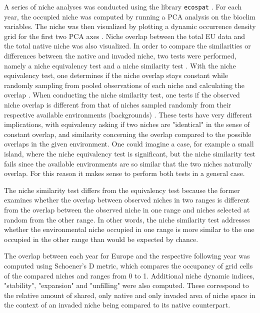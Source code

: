 \documentclass[12pt,a4paper]{article}
\begin{document}
A series of niche analyses was conducted using the library \texttt{ecospat} \autocite{dicola2017ecospat}.
For each year, the occupied niche was computed by running a PCA analysis on the bioclim variables.
The niche was then visualized by plotting a dynamic occurrence density grid for the first two PCA axes \autocite{broennimann2012niche}.
Niche overlap between the total EU data and the total native niche was also visualized.
In order to compare the similarities or differences between the native and invaded niche, two tests were performed, namely a niche equivalency test and a niche similarity test \autocite{broennimann2012niche}.
With the niche equivalency test, one determines if the niche overlap stays constant while randomly sampling from pooled observations of each niche and calculating the overlap \autocite{broennimann2012niche}.
When conducting the niche similarity test, one tests if the observed niche overlap is different from that of niches sampled randomly from their respective available environments (backgrounds) \autocite{broennimann2012niche}.
These tests have very different implications, with equivalency asking if two niches are "identical" in the sense of constant overlap, and similarity concerning the overlap compared to the possible overlaps in the given environment.
One could imagine a case, for example a small island, where the niche equivalency test is significant, but the niche similarity test fails since the available environments are so similar that the two niches naturally overlap.
For this reason it makes sense to perform both tests in a general case.


The niche similarity test differs from the equivalency test
because the former examines whether the overlap between
observed niches in two ranges is different from the overlap
between the observed niche in one range and niches selected at
random from the other range. In other words, the niche similarity test addresses whether the environmental niche occupied
in one range is more similar to the one occupied in the other
range than would be expected by chance.

The overlap between each year for Europe and the respective following year was computed using Schoener's D metric, which compares the occupancy of grid cells of the compared niches and ranges from 0 to 1.
Additional niche dynamic indices, "stability", "expansion" and "unfilling" \autocite{guisan2014nichedyn} were also computed.
These correspond to the relative amount of shared, only native and only invaded area of niche space in the context of an invaded niche being compared to its native counterpart.
\end{document}
